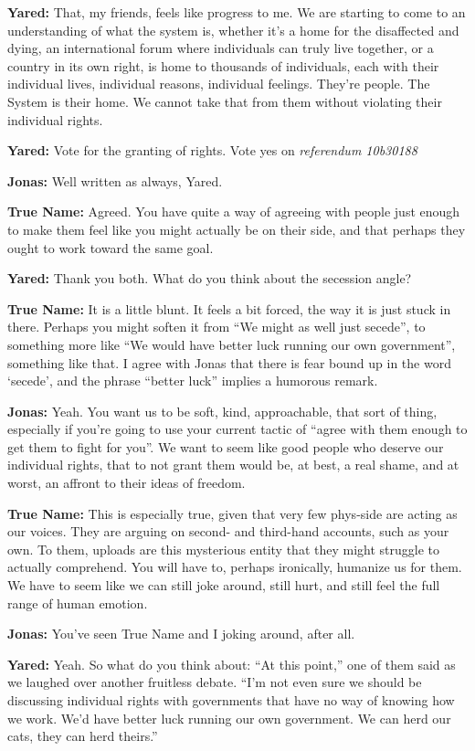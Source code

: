 \textbf{Yared:} That, my friends, feels like progress to me. We are starting to come to an understanding of what the system is, whether it's a home for the disaffected and dying, an international forum where individuals can truly live together, or a country in its own right, is home to thousands of individuals, each with their individual lives, individual reasons, individual feelings. They're people. The System is their home. We cannot take that from them without violating their individual rights.

\textbf{Yared:} Vote for the granting of rights. Vote yes on \emph{referendum 10b30188}

\textbf{Jonas:} Well written as always, Yared.

\textbf{True Name:} Agreed. You have quite a way of agreeing with people just enough to make them feel like you might actually be on their side, and that perhaps they ought to work toward the same goal.

\textbf{Yared:} Thank you both. What do you think about the secession angle?

\textbf{True Name:} It is a little blunt. It feels a bit forced, the way it is just stuck in there. Perhaps you might soften it from ``We might as well just secede'', to something more like ``We would have better luck running our own government'', something like that. I agree with Jonas that there is fear bound up in the word `secede', and the phrase ``better luck'' implies a humorous remark.

\textbf{Jonas:} Yeah. You want us to be soft, kind, approachable, that sort of thing, especially if you're going to use your current tactic of ``agree with them enough to get them to fight for you''. We want to seem like good people who deserve our individual rights, that to not grant them would be, at best, a real shame, and at worst, an affront to their ideas of freedom.

\textbf{True Name:} This is especially true, given that very few phys-side are acting as our voices. They are arguing on second- and third-hand accounts, such as your own. To them, uploads are this mysterious entity that they might struggle to actually comprehend. You will have to, perhaps ironically, humanize us for them. We have to seem like we can still joke around, still hurt, and still feel the full range of human emotion.

\textbf{Jonas:} You've seen True Name and I joking around, after all.

\textbf{Yared:} Yeah. So what do you think about: ``At this point,'' one of them said as we laughed over another fruitless debate. ``I'm not even sure we should be discussing individual rights with governments that have no way of knowing how we work. We'd have better luck running our own government. We can herd our cats, they can herd theirs.''

